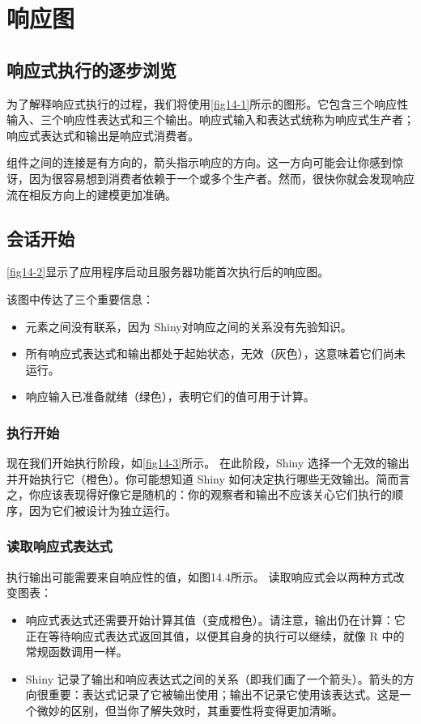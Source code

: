 \chapter{响应图\label{ch14}}
\section{响应式执行的逐步浏览}
为了解释响应式执行的过程，我们将使用\autoref{fig14-1}所示的图形。它包含三个响应性输入、三个响应性表达式和三个输出。响应式输入和表达式统称为响应式生产者；响应式表达式和输出是响应式消费者。

组件之间的连接是有方向的，箭头指示响应的方向。这一方向可能会让你感到惊讶，因为很容易想到消费者依赖于一个或多个生产者。然而，很快你就会发现响应流在相反方向上的建模更加准确。
\section{会话开始}
\autoref{fig14-2}显示了应用程序启动且服务器功能首次执行后的响应图。


该图中传达了三个重要信息：
\begin{itemize}
    \item 元素之间没有联系，因为 Shiny对响应之间的关系没有先验知识。
    \item 所有响应式表达式和输出都处于起始状态，无效（灰色），这意味着它们尚未运行。
    \item 响应输入已准备就绪（绿色），表明它们的值可用于计算。
\end{itemize}

\subsection{执行开始}
现在我们开始执行阶段，如\autoref{fig14-3}所示。
在此阶段，Shiny 选择一个无效的输出并开始执行它（橙色）。你可能想知道 Shiny 如何决定执行哪些无效输出。简而言之，你应该表现得好像它是随机的：你的观察者和输出不应该关心它们执行的顺序，因为它们被设计为独立运行。
\subsection{读取响应式表达式}
执行输出可能需要来自响应性的值，如图14.4所示。
读取响应式会以两种方式改变图表：
\begin{itemize}
    \item 响应式表达式还需要开始计算其值（变成橙色）。请注意，输出仍在计算：它正在等待响应式表达式返回其值，以便其自身的执行可以继续，就像 R 中的常规函数​​调用一样。

    \item Shiny 记录了输出和响应表达式之间的关系（即我们画了一个箭头）。箭头的方向很重要：表达式记录了它被输出使用；输出不记录它使用该表达式。这是一个微妙的区别，但当你了解失效时，其重要性将变得更加清晰。
\end{itemize}
